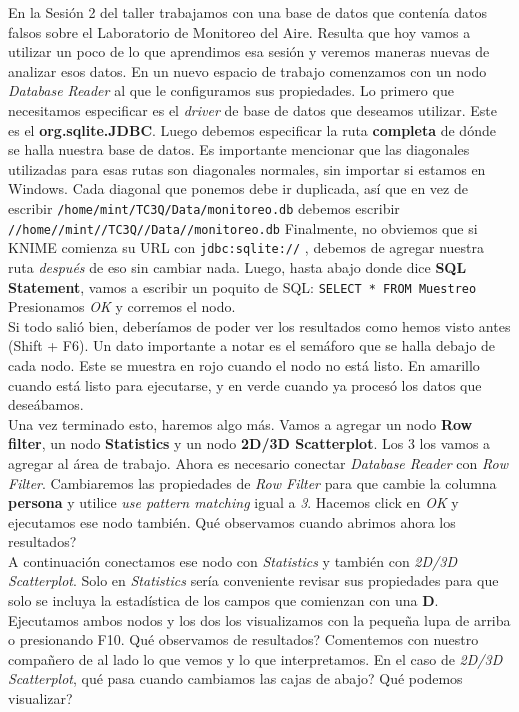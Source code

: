\documentclass[10pt,letterpaper]{article}
\newcommand{\inlinecode}[1]{
\colorbox{light-gray}{\texttt{#1}}
}
\begin{document}
En la Sesi\'on 2 del taller trabajamos con una base de datos que conten\'ia datos falsos sobre el Laboratorio de Monitoreo del Aire. Resulta que hoy vamos a utilizar un poco de lo que aprendimos esa sesi\'on y veremos maneras nuevas de analizar esos datos. En un nuevo espacio de trabajo comenzamos con un nodo \emph{Database Reader} al que le configuramos sus propiedades. Lo primero que necesitamos especificar es el \emph{driver} de base de datos que deseamos utilizar. Este es el \textbf{org.sqlite.JDBC}. Luego debemos especificar la ruta \textbf{completa} de d\'onde se halla nuestra base de datos. Es importante mencionar que las diagonales utilizadas para esas rutas son diagonales normales, sin importar si estamos en Windows. Cada diagonal que ponemos debe ir duplicada, as\'i que en vez de escribir \inlinecode{/home/mint/TC3Q/Data/monitoreo.db} debemos escribir \inlinecode{//home//mint//TC3Q//Data//monitoreo.db} Finalmente, no obviemos que si KNIME comienza su URL con \inlinecode{jdbc:sqlite://}, debemos de agregar nuestra ruta \emph{despu\'es} de eso sin cambiar nada. Luego, hasta abajo donde dice \textbf{SQL Statement}, vamos a escribir un poquito de SQL: \inlinecode{SELECT * FROM Muestreo} Presionamos \emph{OK} y corremos el nodo.\\

Si todo sali\'o bien, deber\'iamos de poder ver los resultados como hemos visto antes (Shift + F6). Un dato importante a notar es el sem\'aforo que se halla debajo de cada nodo. Este se muestra en rojo cuando el nodo no est\'a listo. En amarillo cuando est\'a listo para ejecutarse, y en verde cuando ya proces\'o los datos que dese\'abamos.\\

Una vez terminado esto, haremos algo m\'as. Vamos a agregar un nodo \textbf{Row filter}, un nodo \textbf{Statistics} y un nodo \textbf{2D/3D Scatterplot}. Los 3 los vamos a agregar al \'area de trabajo. Ahora es necesario conectar \emph{Database Reader} con \emph{Row Filter}. Cambiaremos las propiedades de \emph{Row Filter} para que cambie la columna \textbf{persona} y utilice \emph{use pattern matching} igual a \emph{3}. Hacemos click en \emph{OK} y ejecutamos ese nodo tambi\'en. Qu\'e observamos cuando abrimos ahora los resultados?\\

A continuaci\'on conectamos ese nodo con \emph{Statistics} y tambi\'en con \emph{2D/3D Scatterplot}. Solo en \emph{Statistics} ser\'ia conveniente revisar sus propiedades para que solo se incluya la estad\'istica de los campos que comienzan con una \textbf{D}. Ejecutamos ambos nodos y los dos los visualizamos con la peque\~na lupa de arriba o presionando F10. Qu\'e observamos de resultados? Comentemos con nuestro compa\~nero de al lado lo que vemos y lo que interpretamos. En el caso de \emph{2D/3D Scatterplot}, qu\'e pasa cuando cambiamos las cajas de abajo? Qu\'e podemos visualizar?
\end{document}
